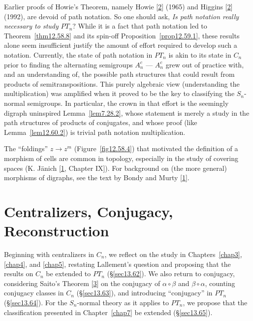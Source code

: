 \documentclass{surv-l}
\numberwithin{equation}{section}
\numberwithin{table}{section}
\numberwithin{figure}{section}
\theoremstyle{definition}
\begin{document}
Earlier proofs of Howie's Theorem, namely
Howie [\hyperlink{bib31a}{2}] (1965) and
Higgins [\hyperlink{bib28a}{2}]
(1992), are devoid of path notation. So one should ask, \emph{Is
path notation really necessary to study} $PT_{n}$? While it is a
fact that path notation led to Theorem~\ref{thm12.58.8} and its
spin-off Proposition~\ref{prop12.59.1}, these results alone seem
insufficient justify the amount of effort required to develop such
a notation. Currently, the state of path notation in $PT_{n}$ is
akin to its state in $C_{n}$ prior to finding the alternating
semigroups $A_{n}^{c}$ --- $A_{n}^{c}$ grew out of practice with, and an
understanding of, the possible path structures that could result
from products of semitranspositions. This purely algebraic view
(understanding the multiplication) was amplified when it proved to
be the key to classifying the $S_{n}$-normal semigroups. In
particular, the crown in that effort is the seemingly digraph
uninspired Lemma~\ref{lem7.28.2}, whose statement is merely a
study in the path structures of products of conjugates, and whose
proof (like Lemma~\ref{lem12.60.2}) is trivial path notation
multiplication.

The ``foldings'' $z\rightarrow z^{m}$ (Figure~\ref{fig12.58.4})
that motivated the definition of a morphism of cells are common in
topology, especially in the study of covering spaces (K.
J\"{a}nich [\hyperlink{bib33}{1},
Chapter IX]). For background on (the more general) morphisms of
digraphs, see the text by Bondy and Murty
[\hyperlink{bib5}{1}].

\chapter{Centralizers, Conjugacy, Reconstruction}\label{chap13}

Beginning with centralizers in $C_{n}$, we reflect on the study in
Chapters~\ref{chap3}, \ref{chap4}, and \ref{chap5}, restating
Lallement's question and proposing that the results on $C_{n}$ be
extended to $PT_{n}$ (\S\ref{sec13.62}). We also return to
conjugacy, considering Saito's Theorem
[\hyperlink{bib67b}{3}] on the conjugacy of $\alpha
\circ\beta$ and $\beta \circ\alpha$, counting conjugacy classes in
$C_{n}$ (\S\ref{sec13.63}), and introducing ``conjugacy'' in
$PT_{n}$ (\S\ref{sec13.64}). For the $S_{n}$-normal theory as it
applies to $PT_{n}$, we propose that the classification presented
in Chapter~\ref{chap7} be extended (\S\ref{sec13.65}).
\end{document}
